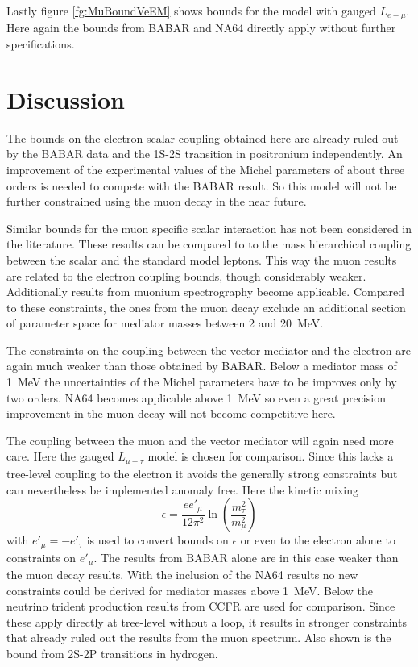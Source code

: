 Lastly figure \ref{fg:MuBoundVeEM} shows bounds for the model with gauged $L_{e-\mu}$. Here again the bounds from BABAR and NA64 directly apply without further specifications.

\section{Discussion}
The bounds on the electron-scalar coupling obtained here are already ruled out by the BABAR data and the 1S-2S transition in positronium independently. An improvement of the experimental values of the Michel parameters of about three orders is needed to compete with the BABAR result. So this model will not be further constrained using the muon decay in the near future. 

Similar bounds for the muon specific scalar interaction has not been considered in the literature. These results can be compared to to the mass hierarchical coupling between the scalar and the standard model leptons. This way the muon results are related to the electron coupling bounds, though considerably weaker. Additionally results from muonium spectrography become applicable. Compared to these constraints, the ones from the muon decay exclude an additional section of parameter space for mediator masses between 2 and \SI{20}{\mega \eV}.

The constraints on the coupling between the vector mediator and the electron are again much weaker than those obtained by BABAR. Below a mediator mass of \SI{1}{\mega \eV} the uncertainties of the Michel parameters have to be improves only by two orders. NA64 becomes applicable above \SI{1}{\mega \eV} so even a great precision improvement in the muon decay will not become competitive here.

The coupling between the muon and the vector mediator will again need more care. Here the gauged $L_{\mu-\tau}$ model is chosen for comparison. Since this lacks a tree-level coupling to the electron it avoids the generally strong constraints but can nevertheless be implemented anomaly free. Here the kinetic mixing
\begin{equation}
\epsilon = \frac{ee'_\mu}{12\pi^2}\ln\left(\frac{m_\tau^2}{m_\mu^2}\right)
\end{equation}
with $e'_\mu=-e'_\tau$ is used to convert bounds on $\epsilon$ or even to the electron alone to constraints on $e'_\mu$. The results from BABAR alone are in this case weaker than the muon decay results. With the inclusion of the NA64 results no new constraints could be derived for mediator masses above \SI{1}{\mega\eV}. Below the neutrino trident production results from CCFR are used for comparison. Since these apply directly at tree-level without a loop, it results in stronger constraints that already ruled out the results from the muon spectrum. Also shown is the bound from 2S-2P transitions in hydrogen. 

